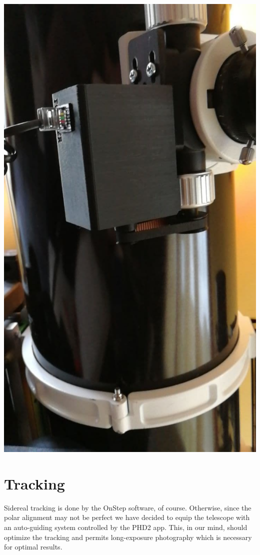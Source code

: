 \documentclass{article}
\begin{document}
\begin{multicols}{2}
        \begin{minipage}
            {0.5\textwidth}
            \centering
            \includegraphics[scale=0.5]{FOCUSER-box.jpg}
            \label{fig:focuser-box}
        \end{minipage}

        \section{Tracking}
        Sidereal tracking is done by the OnStep software, of course.
        Otherwise, since the polar alignment may not be perfect we have decided to equip the telescope with an auto-guiding system controlled by the PHD2 app.
        This, in our mind, should optimize the tracking and permits long-exposure photography which is necessary for optimal results.


\end{multicols}
\end{document}

